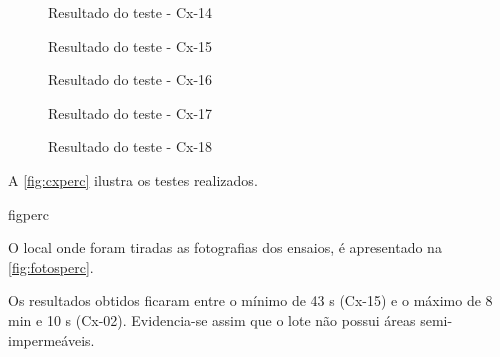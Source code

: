 \begin{figure}[htb!]\caption{Resultado do teste - Cx-14}\label{fig:cx14}\end{figure}
\begin{figure}[htb!]\caption{Resultado do teste - Cx-15}\label{fig:cx15}\end{figure}
\begin{figure}[htb!]\caption{Resultado do teste - Cx-16}\label{fig:cx16}\end{figure}
\begin{figure}[htb!]\caption{Resultado do teste - Cx-17}\label{fig:cx17}\end{figure}
\clearpage
\begin{figure}[htb!]\caption{Resultado do teste - Cx-18}\label{fig:cx18}\end{figure}


\FloatBarrier



A \cref{fig:cxperc} ilustra os testes realizados.


{figperc}

O local onde foram tiradas as fotografias
dos ensaios, é apresentado na \cref{fig:fotosperc}.


\FloatBarrier
Os resultados obtidos ficaram entre o mínimo de 43 s (Cx-15) e o 
máximo de  8 min e 10 s (Cx-02). Evidencia-se assim que o  lote não possui áreas semi-impermeáveis.

